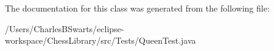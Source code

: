 The documentation for this class was generated from the following file\+:\begin{DoxyCompactItemize}
\item 
/\+Users/\+Charles\+B\+Swarts/eclipse-\/workspace/\+Chess\+Library/src/\+Tests/Queen\+Test.\+java\end{DoxyCompactItemize}
